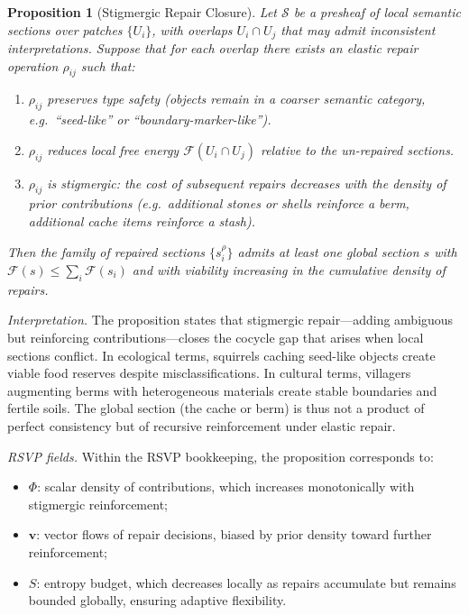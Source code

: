 \documentclass{article}
\newtheorem{proposition}{Proposition}
\begin{document}
\begin{proposition}[Stigmergic Repair Closure]
Let $\mathcal{S}$ be a presheaf of local semantic sections over patches $\{U_i\}$, with overlaps $U_i \cap U_j$ that may admit inconsistent interpretations. Suppose that for each overlap there exists an elastic repair operation $\rho_{ij}$ such that:
\begin{enumerate}
    \item $\rho_{ij}$ preserves type safety (objects remain in a coarser semantic category, e.g.\ ``seed-like'' or ``boundary-marker-like'').
    \item $\rho_{ij}$ reduces local free energy $\mathcal{F}(U_i \cap U_j)$ relative to the un-repaired sections.
    \item $\rho_{ij}$ is stigmergic: the cost of subsequent repairs decreases with the density of prior contributions (e.g.\ additional stones or shells reinforce a berm, additional cache items reinforce a stash).
\end{enumerate}
Then the family of repaired sections $\{s_i^\rho\}$ admits at least one global section $s$ with $\mathcal{F}(s) \leq \sum_i \mathcal{F}(s_i)$ and with viability increasing in the cumulative density of repairs.
\end{proposition}

\noindent
\emph{Interpretation.} The proposition states that stigmergic repair---adding ambiguous but reinforcing contributions---closes the cocycle gap that arises when local sections conflict. In ecological terms, squirrels caching seed-like objects create viable food reserves despite misclassifications. In cultural terms, villagers augmenting berms with heterogeneous materials create stable boundaries and fertile soils. The global section (the cache or berm) is thus not a product of perfect consistency but of recursive reinforcement under elastic repair.

\noindent
\emph{RSVP fields.} Within the RSVP bookkeeping, the proposition corresponds to:
\begin{itemize}
    \item $\Phi$: scalar density of contributions, which increases monotonically with stigmergic reinforcement;
    \item $\mathbf{v}$: vector flows of repair decisions, biased by prior density toward further reinforcement;
    \item $S$: entropy budget, which decreases locally as repairs accumulate but remains bounded globally, ensuring adaptive flexibility.
\end{itemize}
\end{document}
